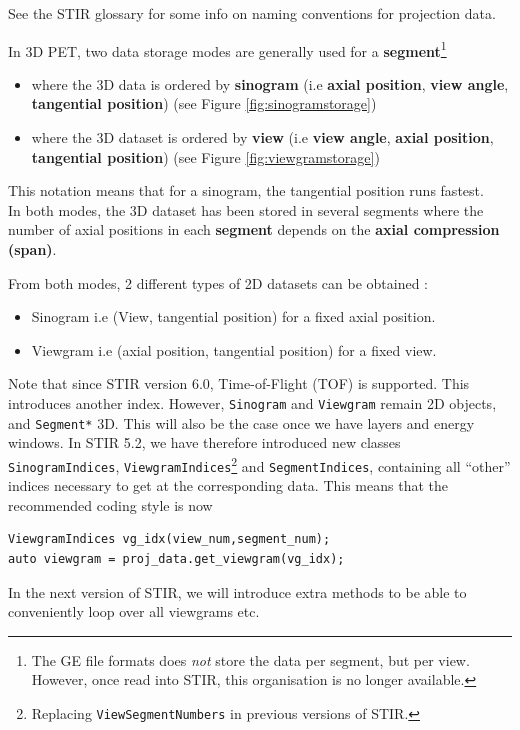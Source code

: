 \documentclass{article}
\begin{document}
See the STIR glossary for some info on naming conventions for 
projection data.


In 3D PET, two data storage modes are generally used for a \textbf{segment}\footnote{{The 
GE file formats does \textit{not} store the data per segment, 
but per view. However, 
once read into STIR, this organisation is no longer available. 
}}
\begin{itemize}
\item 
where the 3D data is ordered by \textbf{sinogram} (i.e \textbf{axial position}, \textbf{view 
angle}, \textbf{tangential position})
(see Figure \ref{fig:sinogramstorage})
\item where the 3D dataset is ordered by \textbf{view} (i.e \textbf{view angle}, \textbf{axial 
position}, \textbf{tangential position})
(see Figure \ref{fig:viewgramstorage})
\end{itemize}

This notation means that for a sinogram, the tangential position 
runs fastest.\\
In both modes, the 3D dataset has been stored in several segments 
where the number of axial positions in each \textbf{segment} depends 
on the \textbf{axial compression (span)}.


From both modes, 2 different types of 2D datasets can be obtained 
:
\begin{itemize}
\item Sinogram i.e (View, tangential position) for a fixed axial 
position.
\item Viewgram i.e (axial position, tangential position) for a fixed 
view.
\end{itemize} 

Note that since STIR version 6.0, Time-of-Flight (TOF) is supported. This introduces another
index. However, \texttt{Sinogram} and \texttt{Viewgram} remain 2D objects, and \texttt{Segment*} 3D.
This will also be the case once we have layers and energy windows.
In STIR 5.2, we have therefore introduced new classes
\texttt{SinogramIndices}, \texttt{ViewgramIndices}\footnote{Replacing \texttt{ViewSegmentNumbers} in previous versions of STIR.}
and \texttt{SegmentIndices}, containing all ``other''
indices necessary to get at the corresponding data. This means that the recommended coding style is now
\begin{verbatim}
ViewgramIndices vg_idx(view_num,segment_num);
auto viewgram = proj_data.get_viewgram(vg_idx);
\end{verbatim}
In the next version of STIR, we will introduce extra methods to be able to conveniently loop over all viewgrams etc.
\end{document}

